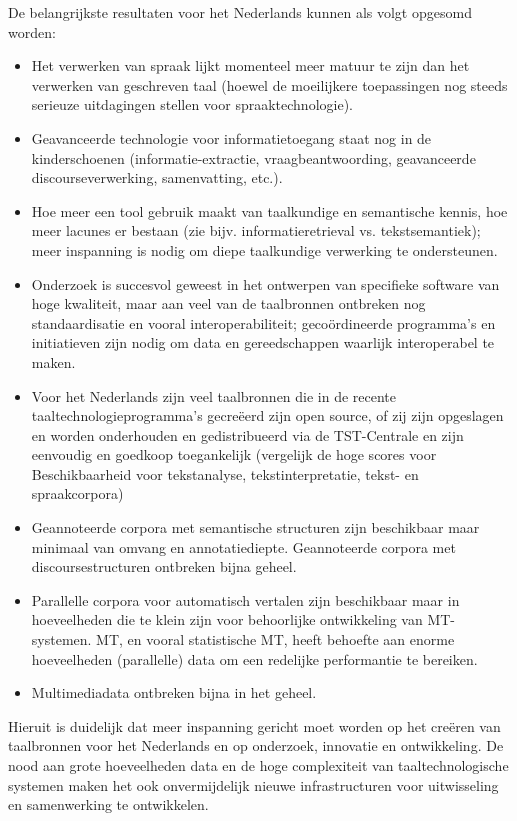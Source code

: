 \documentclass[]{../../metanetpaper}
\begin{document}
\begin{multicols}{2}
De belangrijkste resultaten voor het Nederlands kunnen als volgt opgesomd worden:
\begin{itemize}
   \item Het verwerken van spraak lijkt momenteel meer matuur te zijn dan het verwerken van geschreven taal (hoewel de moeilijkere toepassingen nog steeds serieuze uitdagingen stellen voor spraaktechnologie).
   \item Geavanceerde technologie voor informatietoegang staat nog in de kinderschoenen (informatie-extractie, vraagbeantwoording, geavanceerde discourseverwerking, samenvatting, etc.).
   \item Hoe meer een tool gebruik maakt van taalkundige en semantische kennis, hoe meer lacunes er bestaan (zie bijv. informatieretrieval vs. tekstsemantiek); meer inspanning is nodig om diepe taalkundige verwerking te ondersteunen.
   \item Onderzoek is succesvol geweest in het ontwerpen van specifieke software van hoge kwaliteit, maar aan veel van de taalbronnen ontbreken nog standaardisatie en vooral interoperabiliteit; geco{\"o}rdineerde programma's en initiatieven zijn nodig om data en gereedschappen waarlijk interoperabel te maken.
   \item Voor het Nederlands zijn veel taalbronnen die in de recente taaltechnologieprogramma's gecre{\"e}erd zijn open source, of zij zijn opgeslagen en worden onderhouden en gedistribueerd via de TST-Centrale en zijn eenvoudig en goedkoop toegankelijk (vergelijk de hoge scores voor Beschikbaarheid voor tekstanalyse, tekstinterpretatie, tekst- en spraakcorpora)
   \item Geannoteerde corpora met semantische structuren zijn beschikbaar maar minimaal van omvang en annotatiediepte. Geannoteerde corpora met discoursestructuren ontbreken bijna geheel.
   \item Parallelle corpora voor automatisch vertalen zijn beschikbaar maar in hoeveelheden die te klein zijn voor behoorlijke ontwikkeling van MT-systemen. MT, en vooral statistische MT, heeft behoefte aan enorme hoeveelheden (parallelle) data om een redelijke performantie te bereiken.
   \item Multimediadata ontbreken bijna in het geheel.
   \end{itemize}

Hieruit is duidelijk dat meer inspanning gericht moet worden op het cre{\"e}ren van taalbronnen voor het Nederlands en op onderzoek, innovatie en ontwikkeling. De nood aan grote hoeveelheden data en de hoge complexiteit van taaltechnologische systemen maken het ook onvermijdelijk nieuwe infrastructuren voor uitwisseling en samenwerking te ontwikkelen.


\end{multicols}
\end{document}
